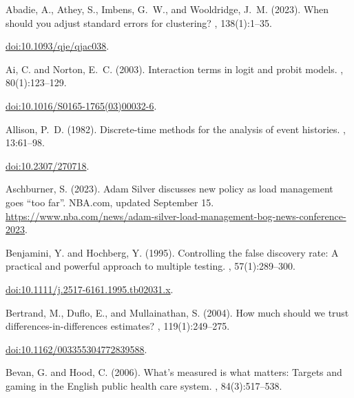 \documentclass[11pt]{article}
\begin{document}
\FloatBarrier
\par\bigskip\small{}\setlength{\parskip}{0pt}

\begin{thebibliography}{}

Abadie, A., Athey, S., Imbens, G.~W., and Wooldridge, J.~M. (2023).
\newblock When should you adjust standard errors for clustering?
, 138(1):1--35.

\newblock \href{https://doi.org/10.1093/qje/qjac038}{doi:10.1093/qje/qjac038}.\par
{}
Ai, C. and Norton, E.~C. (2003).
\newblock Interaction terms in logit and probit models.
, 80(1):123--129.

\newblock \href{https://doi.org/10.1016/S0165-1765(03)00032-6}{doi:10.1016/S0165-1765(03)00032-6}.\par
{}
Allison, P.~D. (1982).
\newblock Discrete-time methods for the analysis of event histories.
, 13:61--98.

\newblock \href{https://doi.org/10.2307/270718}{doi:10.2307/270718}.\par
{}
Aschburner, S. (2023).
\newblock Adam Silver discusses new policy as load management goes ``too far''.
\newblock NBA.com, updated September 15.
\newblock \url{https://www.nba.com/news/adam-silver-load-management-bog-news-conference-2023}.\par

Benjamini, Y. and Hochberg, Y. (1995).
\newblock Controlling the false discovery rate: A practical and powerful
  approach to multiple testing.
, 57(1):289--300.

\newblock \href{https://doi.org/10.1111/j.2517-6161.1995.tb02031.x}{doi:10.1111/j.2517-6161.1995.tb02031.x}.\par
{}
Bertrand, M., Duflo, E., and Mullainathan, S. (2004).
\newblock How much should we trust differences-in-differences estimates?
, 119(1):249--275.

\newblock \href{https://doi.org/10.1162/003355304772839588}{doi:10.1162/003355304772839588}.\par
{}
Bevan, G. and Hood, C. (2006).
\newblock What's measured is what matters: Targets and gaming in the English
  public health care system.
, 84(3):517--538.


\end{thebibliography}
\end{document}
